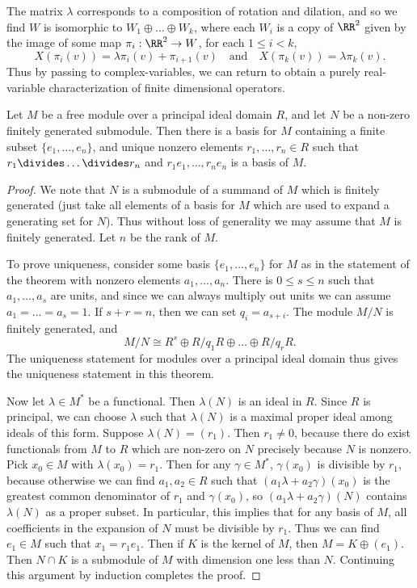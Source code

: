 \begin{example}
    The matrix $\lambda$ corresponds to a composition of rotation and dilation, and so we find $W$ is isomorphic to $W_1 \oplus \dots \oplus W_k$, where each $W_i$ is a copy of $\RR^2$ given by the image of some map $\pi_i: \RR^2 \to W$, for each $1 \leq i < k$,
    \[ X(\pi_i(v)) = \lambda \pi_i(v) + \pi_{i+1}(v) \quad\text{and}\quad X(\pi_k(v)) = \lambda \pi_k(v). \]
    Thus by passing to complex-variables, we can return to obtain a purely real-variable characterization of finite dimensional operators.
\end{example}

\begin{theorem}
    Let $M$ be a free module over a principal ideal domain $R$, and let $N$ be a non-zero finitely generated submodule. Then there is a basis for $M$ containing a finite subset $\{ e_1, \dots, e_n \}$, and unique nonzero elements $r_1,\dots,r_n \in R$ such that $r_1 \divides \dots \divides r_n$ and $r_1e_1, \dots, r_ne_n$ is a basis of $M$.
\end{theorem}
\begin{proof}
    We note that $N$ is a submodule of a summand of $M$ which is finitely generated (just take all elements of a basis for $M$ which are used to expand a generating set for $N$). Thus without loss of generality we may assume that $M$ is finitely generated. Let $n$ be the rank of $M$.

    To prove uniqueness, consider some basis $\{ e_1, \dots, e_n \}$ for $M$ as in the statement of the theorem with nonzero elements $a_1,\dots, a_n$. There is $0 \leq s \leq n$ such that $a_1,\dots,a_s$ are units, and since we can always multiply out units we can assume $a_1 = \dots = a_s = 1$. If $s + r = n$, then we can set $q_i = a_{s+i}$. The module $M/N$ is finitely generated, and
    \[ M/N \cong R^s \oplus R/q_1R \oplus \dots \oplus R/q_rR. \]
    The uniqueness statement for modules over a principal ideal domain thus gives the uniqueness statement in this theorem.

    Now let $\lambda \in M^*$ be a functional. Then $\lambda(N)$ is an ideal in $R$. Since $R$ is principal, we can choose $\lambda$ such that $\lambda(N)$ is a maximal proper ideal among ideals of this form. Suppose $\lambda(N) = (r_1)$. Then $r_1 \neq 0$, because there do exist functionals from $M$ to $R$ which are non-zero on $N$ precisely because $N$ is nonzero. Pick $x_0 \in M$ with $\lambda(x_0) = r_1$. Then for any $\gamma \in M^*$, $\gamma(x_0)$ is divisible by $r_1$, because otherwise we can find $a_1,a_2 \in R$ such that $(a_1 \lambda + a_2 \gamma)(x_0)$ is the greatest common denominator of $r_1$ and $\gamma(x_0)$, so $(a_1 \lambda + a_2 \gamma)(N)$ contains $\lambda(N)$ as a proper subset. In particular, this implies that for any basis of $M$, all coefficients in the expansion of $N$ must be divisible by $r_1$. Thus we can find $e_1 \in M$ such that $x_1 = r_1e_1$. Then if $K$ is the kernel of $M$, then $M = K \oplus (e_1)$. Then $N \cap K$ is a submodule of $M$ with dimension one less than $N$. Continuing this argument by induction completes the proof.
\end{proof}

